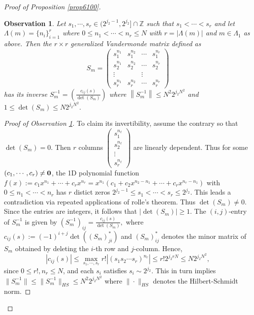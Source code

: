 \documentclass[10pt,a4paper]{amsart}
\newtheorem{ob}{Observation}\numberwithin{ob}{section}
\numberwithin{equation}{section}
\begin{document}
\begin{proof}[Proof of Proposition \ref{prop6100}]
\begin{ob}\label{lem7100} 
Let $s_1,\cdots,s_r\in (2^{j_2-1},2^{j_2}]\cap \mathbb{Z}$ such that $s_1<\cdots<s_r$ and let $\Lambda(m)=\{n_i\}_{i=1}^r$ where $0\le n_1<\cdots<n_r\le N$ with $r=|\Lambda(m)|$  and $m\in \Lambda_1$ as above. Then
  the $r\times r$ generalized Vandermonde matrix defined as
  $$S_m=\left(\begin{matrix}s_1^{n_{1}}&s_1^{n_{2}}& \cdots&s_1^{n_{r}}\\
s_2^{n_{1}}&s_2^{n_{2}}& \cdots&s_2^{n_{r}}\\
\vdots& &\vdots\\
s_{r}^{n_{1}}&s_{r}^{n_{2}}& \cdots&s_{r}^{n_{r}}
  \end{matrix}\right)   $$  has its inverse  $S^{-1}_m=\left(\frac{c_{ij}(s)}{\det(S_m)}\right)$ where $ \left\|S_m^{-1}\right\|\le N^{2} 2^{j_2N^2}$ and $1\le   \det(S_m)\le N 2^{j_2N^2}.$
\end{ob}
\begin{proof}[Proof of Observation \ref{lem7100}] To claim its invertibility, 
assume the contrary so that $\det (S_m)=0$. Then $r$ columns $\left(\begin{matrix}s_1^{n_{\ell}} \\
s_{2}^{n_{\ell}} \\
\vdots \\ 
s_{r}^{n_{\ell}} 
  \end{matrix}\right) $ are linearly dependent.  Thus for some $(c_1,\cdots,c_r)\ne {\bf 0}$, the 1D polynomial function $f(x):= c_1x^{n_1}+\cdots+c_r x^{n_r}=x^{n_1}(c_1+c_2x^{n_2-n_1}+\cdots+c_rx^{n_r-n_1})$ with $0\le n_1<\cdots<n_r$ has $r$ distict zeros $2^{j_2-1}\le s_1<\cdots<s_r\le 2^{j_2}$.  This leads a contradiction via repeated applications of rolle's theorem. Thus $\det(S_m)\ne 0 $.  
Since the   entries are integers,  it follows that  $|\det(S_m)|\ge 1$.  The $(i,j)$-entry  of $S^{-1}_m$ is  given by
$ (S_m^{-1})_{ij}=\frac{c_{ij}(s)}{\det(S_m)}, $ where   $c_{ij}(s):=(-1)^{i+j}\det((S_m)^{*}_{ji}) $ and $(S_m)^{*}_{ij}$ denotes the minor matrix  of $S_m$ obtained by deleting the $i$-th row and $j$-column. Hence, $$|c_{ij}(s)|\le\max_{s_1,\cdots,s_r} r!|(s_1  s_2 \cdots s_r)^{n_{r}}|\le r!2^{j_2 rN}\le N2^{j_2N^2},$$ since $0\le  r!, n_r\le N$, and each $s_i$ satisfies $s_i \sim 2^{j_2}$. This   in turn implies 
 $\|S_m^{-1}\|\le \|S_m^{-1}\|_{HS}\le    N^2 2^{j_2N^2}$ where $\| \cdot \|_{HS}$ denotes the Hilbert-Schmidt norm.
\end{proof}



\end{proof}
\end{document}
